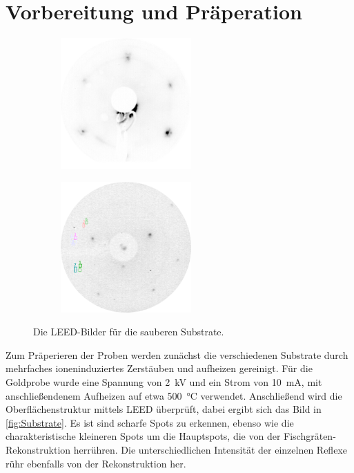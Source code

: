     \section{Vorbereitung und Präperation} \label{sec:Praep}
        \begin{figure}
            \centering
            \begin{subfigure}{0.48\textwidth}
                \centering
                \includegraphics[height=5cm]{./content/pictures/Au/2021_06_08_002_Au(111)_75eV}
                \label{fig:LEED_Au}
            \end{subfigure}
            \begin{subfigure}{0.48\textwidth}
                \centering
                \includegraphics[height=5cm]{./content/pictures/pFe/2021_09_07_002_passivatedFe(100)_125eV.png}
                \label{fig:LEED_pFe}
            \end{subfigure}
            \caption{Die LEED-Bilder für die sauberen Substrate.}
        \label{fig:Substrate}
        \end{figure}
        Zum Präperieren der Proben werden zunächst die verschiedenen Substrate durch mehrfaches ioneninduziertes Zerstäuben und aufheizen gereinigt.
        Für die Goldprobe wurde eine Spannung von \SI{2}{\kilo\volt} und ein Strom von \SI{10}{\milli\ampere}, mit anschließendenem Aufheizen auf etwa \SI{500}{\celsius} verwendet.
        Anschließend wird die Oberflächenstruktur mittels LEED überprüft, dabei ergibt sich das Bild in \autoref{fig:Substrate}.
        Es ist sind scharfe Spots zu erkennen, ebenso wie die charakteristische kleineren Spots um die Hauptspots, die von der Fischgräten-Rekonstruktion herrühren.
        Die unterschiedlichen Intensität der einzelnen Reflexe rühr ebenfalls von der Rekonstruktion her.

